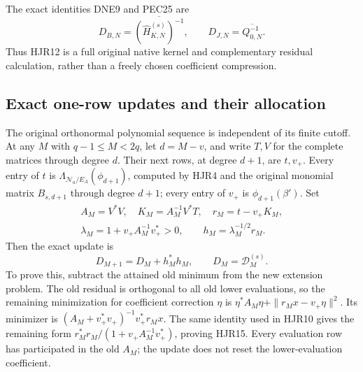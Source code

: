 \documentclass[11pt,a4paper]{article}
\begin{document}
The exact identities DNE9 and PEC25 are
\[
 D_{B,N}=\overline{(\widehat H_{K,N}^{(s)})^{-1}},
 \qquad D_{J,N}=\overline{Q_{0,N}^{-1}}.
 \tag{HJR13}
\]
Thus HJR12 is a full original native kernel and complementary
residual calculation, rather than a freely chosen coefficient
compression.

\subsection{Exact one-row updates and their allocation}

The original orthonormal polynomial sequence is independent
of its finite cutoff. At any $M$ with $q-1\le M<2q$, let
$d=M-v$, and write $T,V$ for the complete matrices through
degree $d$. Their next rows, at degree $d+1$, are $t,v_+$.
Every entry of $t$ is
$\Lambda_{\mathcal N_a/E_A}(\phi_{d+1})$, computed by
HJR4 and the original monomial matrix $B_{s,d+1}$ through
degree $d+1$; every entry of $v_+$ is
$\phi_{d+1}(\beta')$. Set
\[
 \begin{gathered}
 A_M=V^*V,\quad K_M=A_M^{-1}V^*T,\quad
 r_M=t-v_+K_M,\\
 \lambda_M=1+v_+A_M^{-1}v_+^*>0,\qquad
 h_M=\lambda_M^{-1/2}r_M .
 \end{gathered}\tag{HJR14}
\]
Then the exact update is
\[
 D_{M+1}=D_M+h_M^*h_M,\qquad D_M=\mathcal D_M^{(s)}.
 \tag{HJR15}
\]
To prove this, subtract the attained old minimum from the
new extension problem. The old residual is orthogonal to
all old lower evaluations, so the remaining minimization
for coefficient correction $\eta$ is
$\eta^*A_M\eta+\|r_Mx-v_+\eta\|^2$.
Its minimizer is
$(A_M+v_+^*v_+)^{-1}v_+^*r_Mx$.
The same identity used in HJR10 gives the remaining form
$r_M^*r_M/(1+v_+A_M^{-1}v_+^*)$, proving HJR15.
Every evaluation row has participated in the old $A_M$;
the update does not reset the lower-evaluation coefficient.
\end{document}
